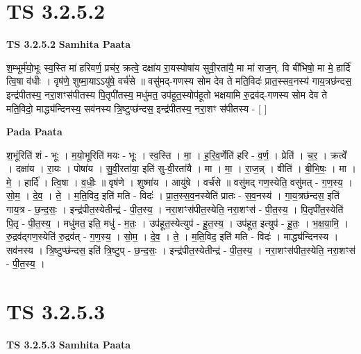 \documentclass[17pt]{extarticle}
\begin{document}
\section*{ TS 3.2.5.2 }

\textbf{TS 3.2.5.2 } \newline
\textbf{Samhita Paata} \newline

श॒म्भूर्म॑यो॒भूः स्व॒स्ति मा॑ हरिवर्ण॒ प्रच॑र॒ क्रत्वे॒ दक्षा॑य रा॒यस्पोषा॑य सुवी॒रता॑यै॒ मा मा॑ राज॒न्. वि बी॑भिषो॒ मा मे॒ हार्दि॑ त्वि॒षा व॑धीः । वृष॑णे॒ शुष्मा॒याऽऽयु॑षे॒ वर्च॑से ॥ वसु॑मद्-गणस्य सोम देव ते मति॒विदः॑ प्रात॒स्सव॒नस्य॑ गाय॒त्रछ॑न्दस॒ इन्द्र॑पीतस्य॒ नरा॒शꣳस॑पीतस्य पि॒तृपी॑तस्य॒ मधु॑मत॒ उप॑हूत॒स्योप॑हूतो भक्षयामि रु॒द्रव॑द्-गणस्य सोम देव ते मति॒विदो॒ माद्ध्य॑न्दिनस्य॒ सव॑नस्य त्रि॒ष्टुप्छ॑न्दस॒ इन्द्र॑पीतस्य॒ नरा॒शꣳ स॑पीतस्य - [  ] \newline

\textbf{Pada Paata} \newline

श॒भूंरिति॑ शं - भूः । म॒यो॒भूरिति॑ मयः - भूः । स्व॒स्ति । मा॒ । ह॒रि॒व॒र्णेति॑ हरि - व॒र्ण॒ । प्रेति॑ । च॒र॒ । क्रत्वे᳚ । दक्षा॑य । रा॒यः । पोषा॑य । सु॒वी॒रता॑या॒ इति॑ सु-वी॒रता॑यै । मा । मा॒ । रा॒ज॒न्न् । वीति॑ । बी॒भि॒षः॒ । मा । मे॒ । हार्दि॑ । त्वि॒षा । व॒धीः॒ ॥ वृष॑णे । शुष्मा॑य । आयु॑षे । वर्च॑से ॥ वसु॑मद् गण॒स्येति॒ वसु॑मत् - ग॒ण॒स्य॒ । सो॒म॒ । दे॒व॒ । ते॒ । म॒ति॒विद॒ इति॑ मति - विदः॑ । प्रा॒त॒स्स॒व॒नस्येति॑ प्रातः - स॒व॒नस्य॑ । गा॒य॒त्रछ॑न्दस॒ इति॑ गाय॒त्र - छ॒न्द॒सः॒ । इन्द्र॑पीत॒स्येतीन्द्र॑ - पी॒त॒स्य॒ । नरा॒शꣳस॑पीत॒स्येति॒ नरा॒शꣳस॑ - पी॒त॒स्य॒ । पि॒तृपी॑त॒स्येति॑ पि॒तृ - पी॒त॒स्य॒ । मधु॑मत॒ इति॒ मधु॑ - म॒तः॒ । उप॑हूत॒स्येत्युप॑ - हू॒त॒स्य॒ । उप॑हूत॒ इत्युप॑ - हू॒तः॒ । भ॒क्ष॒या॒मि॒ । रु॒द्रव॑द्गण॒स्येति॑ रु॒द्रव॑त् - ग॒ण॒स्य॒ । सो॒म॒ । दे॒व॒ । ते॒ । म॒ति॒विद॒ इति॑ मति - विदः॑ । माद्ध्य॑न्दिनस्य । सव॑नस्य । त्रि॒ष्टुप्छ॑न्दस॒ इति॑ त्रि॒ष्टुप् - छ॒न्द॒सः॒ । इन्द्र॑पीत॒स्येतीन्द्र॑ - पी॒त॒स्य॒ । नरा॒शꣳस॑पीत॒स्येति॒ नरा॒शꣳस॑ - पी॒त॒स्य॒ ।  \newline




\section*{ TS 3.2.5.3 }

\textbf{TS 3.2.5.3 } \newline
\textbf{Samhita Paata} \newline
\end{document}
